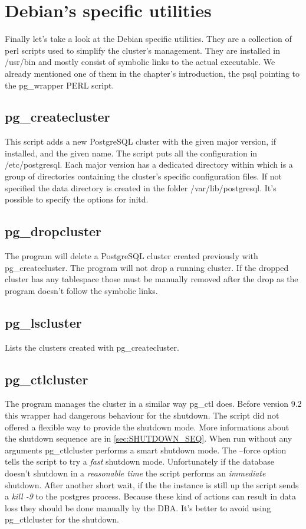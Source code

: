\section{Debian's specific utilities}
Finally let's take a look at the Debian specific utilities. They are a collection of perl scripts 
used to simplify the cluster's management. They are installed in /usr/bin and mostly consist of symbolic 
links to the actual executable. We already mentioned one of them in the chapter's introduction, the 
psql pointing to the pg\_wrapper PERL script.

\subsection{pg\_createcluster}
This script adds a new PostgreSQL cluster with the given major version, if installed, and the 
given name. The script puts all the configuration in /etc/postgresql. Each major version has a 
dedicated directory within which is a group of directories containing the cluster's specific 
configuration files. If not specified the data directory is created in the folder 
/var/lib/postgresql. It's possible to specify the options for initd.

\subsection{pg\_dropcluster}
The program will delete a PostgreSQL cluster created previously with pg\_createcluster. The 
program will not drop a running cluster. If the dropped cluster has any tablespace those must be 
manually removed after the drop as the program doesn't follow the symbolic links.

\subsection{pg\_lscluster}
Lists the clusters created with pg\_createcluster.

\subsection{pg\_ctlcluster}
\label{sub:PGCTLDEB}
The program manages the cluster in a similar way pg\_ctl does. 
Before version 9.2 this wrapper had dangerous behaviour for the shutdown. The script did not 
offered a flexible way to provide the shutdown mode. More informations about the shutdown 
sequence are in \ref{sec:SHUTDOWN_SEQ}. 
When run without any arguments pg\_ctlcluster performs a smart shutdown mode.
The --force option tells the script to try a \textit{fast} shutdown mode. Unfortunately if the 
database doesn't shutdown in a \textit{reasonable time} the script performs an \textit{immediate} 
shutdown. After another short wait, if the the instance is still up the script sends a 
\textit{kill -9} to the postgres process. Because these kind of actions can result in data loss  
they should be done manually by the DBA. It's better to avoid using pg\_ctlcluster for the shutdown.
